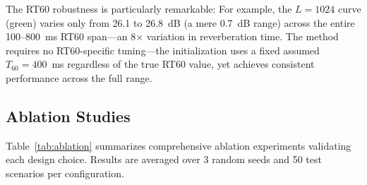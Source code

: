 \documentclass[10pt,conference]{IEEEtran}
\begin{document}
The RT60 robustness is particularly remarkable: For example, the $L=1024$ curve (green) varies only from 26.1 to 26.8~dB (a mere 0.7~dB range) across the entire 100--800~ms RT60 span---an 8$\times$ variation in reverberation time. The method requires no RT60-specific tuning---the initialization uses a fixed assumed $T_{60}=400$~ms regardless of the true RT60 value, yet achieves consistent performance across the full range.

\subsection{Ablation Studies}
\label{sec:ablation}

Table~\ref{tab:ablation} summarizes comprehensive ablation experiments validating each design choice. Results are averaged over 3 random seeds and 50 test scenarios per configuration.
\end{document}
